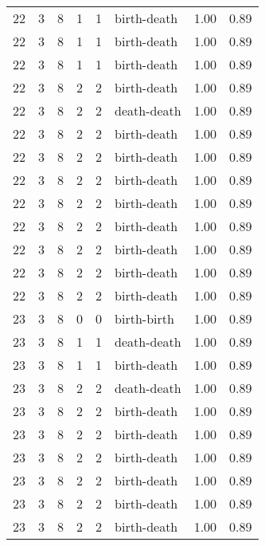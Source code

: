 \documentclass{article}
\begin{document}
\begin{center}
\begin{tabular}{rrrrrlrr}
22 & 3 & 8 & 1 & 1 & birth-death & 1.00 & 0.89 \\
22 & 3 & 8 & 1 & 1 & birth-death & 1.00 & 0.89 \\
22 & 3 & 8 & 1 & 1 & birth-death & 1.00 & 0.89 \\
22 & 3 & 8 & 2 & 2 & birth-death & 1.00 & 0.89 \\
22 & 3 & 8 & 2 & 2 & death-death & 1.00 & 0.89 \\
22 & 3 & 8 & 2 & 2 & birth-death & 1.00 & 0.89 \\
22 & 3 & 8 & 2 & 2 & birth-death & 1.00 & 0.89 \\
22 & 3 & 8 & 2 & 2 & birth-death & 1.00 & 0.89 \\
22 & 3 & 8 & 2 & 2 & birth-death & 1.00 & 0.89 \\
22 & 3 & 8 & 2 & 2 & birth-death & 1.00 & 0.89 \\
22 & 3 & 8 & 2 & 2 & birth-death & 1.00 & 0.89 \\
22 & 3 & 8 & 2 & 2 & birth-death & 1.00 & 0.89 \\
22 & 3 & 8 & 2 & 2 & birth-death & 1.00 & 0.89 \\
23 & 3 & 8 & 0 & 0 & birth-birth & 1.00 & 0.89 \\
23 & 3 & 8 & 1 & 1 & death-death & 1.00 & 0.89 \\
23 & 3 & 8 & 1 & 1 & birth-death & 1.00 & 0.89 \\
23 & 3 & 8 & 2 & 2 & death-death & 1.00 & 0.89 \\
23 & 3 & 8 & 2 & 2 & birth-death & 1.00 & 0.89 \\
23 & 3 & 8 & 2 & 2 & birth-death & 1.00 & 0.89 \\
23 & 3 & 8 & 2 & 2 & birth-death & 1.00 & 0.89 \\
23 & 3 & 8 & 2 & 2 & birth-death & 1.00 & 0.89 \\
23 & 3 & 8 & 2 & 2 & birth-death & 1.00 & 0.89 \\
23 & 3 & 8 & 2 & 2 & birth-death & 1.00 & 0.89 \\
\bottomrule
\end{tabular}


\end{center}
\end{document}
